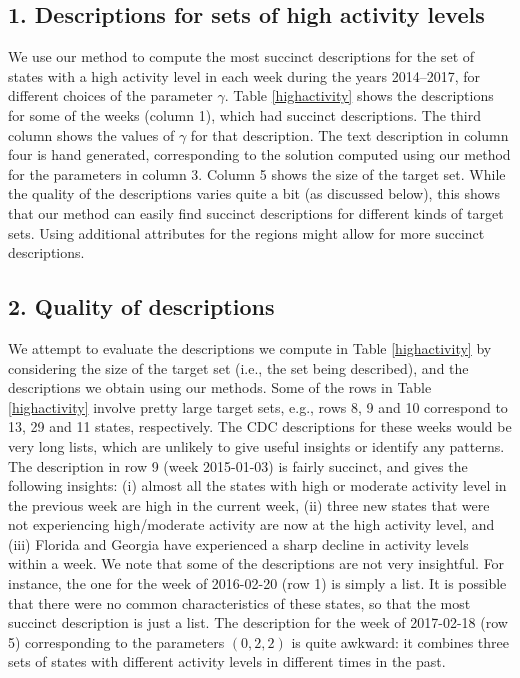 \subsection*{1. Descriptions for sets of high activity levels}
We use our method to compute the most succinct descriptions for the set of states
with a high activity level in each week during the years 2014--2017, for different
choices of the parameter $\gamma$.
Table \ref{highactivity} shows the descriptions for some of the weeks (column 1), which had 
succinct descriptions. The third column shows the values of $\gamma$ for that description.
The text description in column four is hand generated, corresponding to the solution
computed using our method for the parameters in column 3.
Column 5 shows the size of the target set. 
While the quality of the descriptions varies quite a bit (as discussed below), this
shows that our method can easily find succinct descriptions for different kinds of target sets.
Using additional attributes for the regions might allow for more succinct descriptions.



\subsection*{2. Quality of descriptions}
We attempt to evaluate the descriptions we compute in Table \ref{highactivity} by considering
the size of the target set (i.e., the set being described), and the descriptions we obtain
using our methods. Some of the rows in Table \ref{highactivity} involve pretty large
target sets, e.g., rows 8, 9 and 10 correspond to 13, 29 and 11 states, respectively.
The CDC descriptions for these weeks would be very long lists, which are unlikely to
give useful insights or identify any patterns. The description in row 9 (week 2015-01-03)
is fairly succinct, and gives the following insights: 
(i) almost all the states with high or moderate activity level in the previous week are
high in the current week,
(ii) three new states that were not experiencing high/moderate activity are now
at the high activity level, and
(iii) Florida and Georgia have experienced a sharp decline in activity levels within a week.
We note that some of the descriptions are not very insightful. For instance, the one for
the week of 2016-02-20 (row 1) is simply a list. It is possible that there were no common
characteristics of these states, so that the most succinct description is just a list.
The description for the week of 2017-02-18 (row 5) corresponding to the parameters $(0, 2, 2)$
is quite awkward: it combines three sets of states with different activity levels in 
different times in the past.


